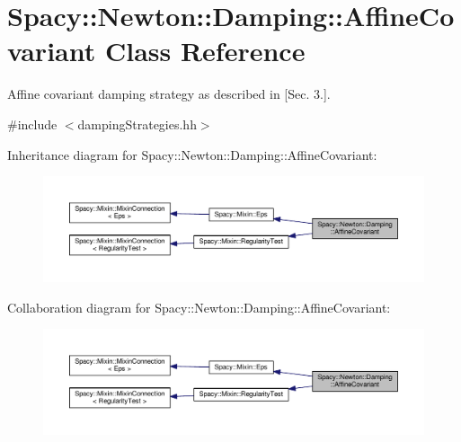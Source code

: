 \hypertarget{classSpacy_1_1Newton_1_1Damping_1_1AffineCovariant}{}\section{Spacy\+:\+:Newton\+:\+:Damping\+:\+:Affine\+Covariant Class Reference}
\label{classSpacy_1_1Newton_1_1Damping_1_1AffineCovariant}


Affine covariant damping strategy as described in \cite{Deuflhard2004} \mbox{[}Sec. 3.\mbox{]}.  




{\ttfamily \#include $<$damping\+Strategies.\+hh$>$}



Inheritance diagram for Spacy\+:\+:Newton\+:\+:Damping\+:\+:Affine\+Covariant\+:\nopagebreak
\begin{figure}[H]
\begin{center}
\leavevmode
\includegraphics[width=350pt]{classSpacy_1_1Newton_1_1Damping_1_1AffineCovariant__inherit__graph}
\end{center}
\end{figure}


Collaboration diagram for Spacy\+:\+:Newton\+:\+:Damping\+:\+:Affine\+Covariant\+:\nopagebreak
\begin{figure}[H]
\begin{center}
\leavevmode
\includegraphics[width=350pt]{classSpacy_1_1Newton_1_1Damping_1_1AffineCovariant__coll__graph}
\end{center}
\end{figure}
